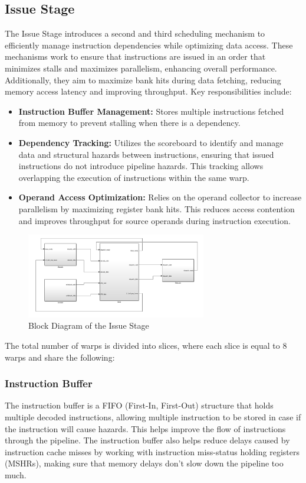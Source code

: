\documentclass[12pt]{report}
\begin{document}
\subsection{Issue Stage}
The Issue Stage introduces a second and third scheduling mechanism to efficiently manage instruction dependencies while optimizing data access. These mechanisms work to ensure that instructions are issued in an order that minimizes stalls and maximizes parallelism, enhancing overall performance. Additionally, they aim to maximize bank hits during data fetching, reducing memory access latency and improving throughput. Key responsibilities include:
\begin{itemize}
    \item \textbf{Instruction Buffer Management:} Stores multiple instructions fetched from memory to prevent stalling when there is a dependency.
    \item \textbf{Dependency Tracking:} Utilizes the scoreboard to identify and manage data and structural hazards between instructions, ensuring that issued instructions do not introduce pipeline hazards. This tracking allows overlapping the execution of instructions within the same warp.
    \item \textbf{Operand Access Optimization:} Relies on the operand collector to increase parallelism by maximizing register bank hits. This reduces access contention and improves throughput for source operands during instruction execution.
\end{itemize}
\begin{figure}[H]
    \centering
    \includegraphics[width=0.7\textwidth]{./figures/issue_top.png}
    \caption{Block Diagram of the Issue Stage}
\end{figure}
\noindent The total number of warps is divided into slices, where each slice is equal to 8 warps and share the following:

\subsubsection{Instruction Buffer}
The instruction buffer is a FIFO (First-In, First-Out) structure that holds multiple decoded instructions, allowing multiple instruction to be stored in case if the instruction will cause hazards. This helps improve the flow of instructions through the pipeline. The instruction buffer also helps reduce delays caused by instruction cache misses by working with instruction miss-status holding registers (MSHRs), making sure that memory delays don't slow down the pipeline too much.
\end{document}
